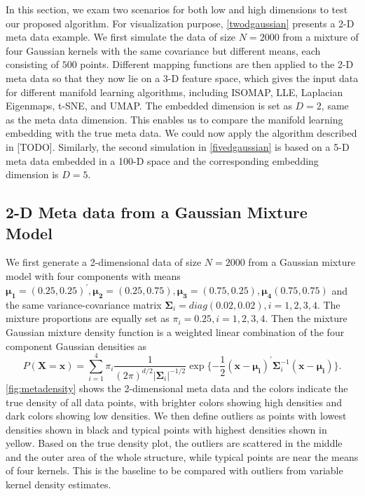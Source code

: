 \documentclass[11pt,a4paper,]{article}
\begin{document}
In this section, we exam two scenarios for both low and high dimensions to test our proposed algorithm. For visualization purpose, \autoref{twodgaussian} presents a 2-D meta data example. We first simulate the data of size \(N=2000\) from a mixture of four Gaussian kernels with the same covariance but different means, each consisting of \(500\) points. Different mapping functions are then applied to the 2-D meta data so that they now lie on a 3-D feature space, which gives the input data for different manifold learning algorithms, including ISOMAP, LLE, Laplacian Eigenmaps, t-SNE, and UMAP. The embedded dimension is set as \(D=2\), same as the meta data dimension. This enables us to compare the manifold learning embedding with the true meta data. We could now apply the algorithm described in {[}TODO{]}. Similarly, the second simulation in \autoref{fivedgaussian} is based on a 5-D meta data embedded in a 100-D space and the corresponding embedding dimension is \(D=5\).

\hypertarget{twodgaussian}{%
\subsection{2-D Meta data from a Gaussian Mixture Model}\label{twodgaussian}}

We first generate a 2-dimensional data of size \(N=2000\) from a Gaussian mixture model with four components with means \(\pmb{\mu_1}=(0.25, 0.25)^\prime, \pmb{\mu_2}=(0.25, 0.75), \pmb{\mu_3}=(0.75, 0.25), \pmb{\mu_4}(0.75, 0.75)\) and the same variance-covariance matrix \(\pmb{\Sigma}_i=diag(0.02, 0.02), i=1,2,3,4\). The mixture proportions are equally set as \(\pi_i=0.25, i=1,2,3,4\).
Then the mixture Gaussian mixture density function is a weighted linear combination of the four component Gaussian densities as
\begin{equation}
\label{eq:gmm}
P(\pmb{X}=\pmb{x}) = \sum_{i=1}^{4}\pi_i \frac{1}{(2\pi)^{d/2}|\pmb{\Sigma}_i|^{-1/2}} \exp{\{-\frac{1}{2} (\pmb{x}-\pmb{\mu_i})^\prime \pmb{\Sigma}_i^{-1} (\pmb{x}-\pmb{\mu_i}) \}}.
\end{equation}
\autoref{fig:metadensity} shows the 2-dimensional meta data and the colors indicate the true density of all data points, with brighter colors showing high densities and dark colors showing low densities. We then define outliers as points with lowest densities shown in black and typical points with highest densities shown in yellow. Based on the true density plot, the outliers are scattered in the middle and the outer area of the whole structure, while typical points are near the means of four kernels. This is the baseline to be compared with outliers from variable kernel density estimates.
\end{document}
